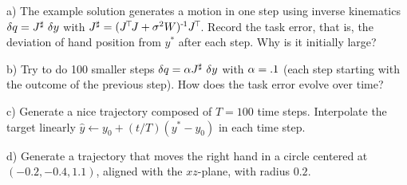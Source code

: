 a) The example solution generates a motion in one step using inverse
kinematics $\delta q = J^\sharp~ \delta y$ with $J^\sharp = (J^{\!\top\!} J + \sigma^2
W)^{{\hspace*{-.0pt}\text{\rm -}\hspace*{-.5pt}}1} J^{\!\top\!}$. Record the task error, that is, the deviation of hand
position from $y^*$ after each step. Why is it initially large?

b) Try to do 100 smaller steps $\delta q = \alpha J^\sharp~ \delta y$ with $\alpha=.1$
(each step starting with the outcome of the previous step). How does
the task error evolve over time?

c) Generate a nice trajectory composed of $T=100$ time
steps. Interpolate the target linearly $\hat y \gets y_0 + (t/T)(y^*-y_0)$ in
each time step.

d) Generate a trajectory that moves the right hand in a circle centered at
$(-0.2, -0.4, 1.1)$, aligned with the $xz$-plane, with radius $0.2$.


\exerfoot
